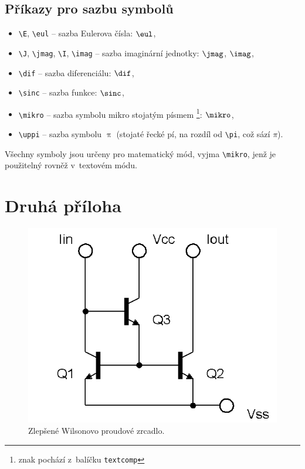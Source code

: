 \section{Příkazy pro sazbu symbolů}

\begin{itemize}
  \item
    \verb|\E|, \verb|\eul| -- sazba Eulerova čísla: $\eul$,
  \item
    \verb|\J|, \verb|\jmag|, \verb|\I|, \verb|\imag| -- sazba imaginární jednotky: $\jmag$, $\imag$,
  \item
    \verb|\dif| -- sazba diferenciálu: $\dif$,
  \item
    \verb|\sinc| -- sazba funkce: $\sinc$,
  \item
    \verb|\mikro| -- sazba symbolu mikro stojatým písmem%
			\footnote{znak pochází z~balíčku \texttt{textcomp}}: $\mikro$,
	\item
		\verb|\uppi| -- sazba symbolu $\uppi$
			(stojaté řecké pí, na rozdíl od \verb|\pi|, což sází $\pi$).
\end{itemize}
%
Všechny symboly jsou určeny pro matematický mód, vyjma \verb|\mikro|, jenž je\\ použitelný rovněž v~textovém módu.


\chapter{Druhá příloha}

\begin{figure}[!h]
  \begin{center}
    \includegraphics[scale=0.5]{obrazky/ZlepseneWilsonovoZrcadloNPN}
  \end{center}
  \caption[Alenčino zrcadlo]{Zlepšené Wilsonovo proudové zrcadlo.}
\end{figure}

